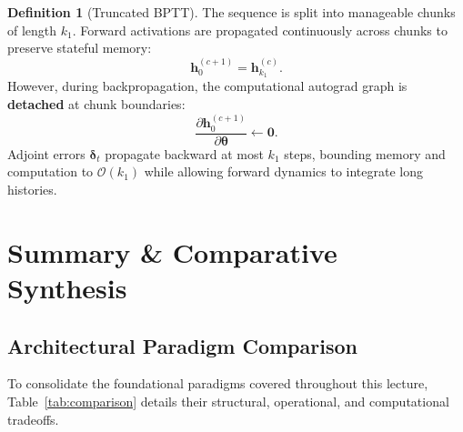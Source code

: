 \documentclass[11pt,a4paper]{article}
\theoremstyle{definition}
\newtheorem{definition}{Definition}[section]
\theoremstyle{plain}
\begin{document}
\begin{definition}[Truncated BPTT]
The sequence is split into manageable chunks of length $k_1$. Forward activations are propagated continuously across chunks to preserve stateful memory:
\begin{equation}
    \mathbf{h}_0^{(c+1)} = \mathbf{h}_{k_1}^{(c)}.
\end{equation}
However, during backpropagation, the computational autograd graph is \textbf{detached} at chunk boundaries:
\begin{equation}
    \frac{\partial \mathbf{h}_0^{(c+1)}}{\partial \boldsymbol{\theta}} \leftarrow \mathbf{0}.
\end{equation}
Adjoint errors $\boldsymbol{\delta}_t$ propagate backward at most $k_1$ steps, bounding memory and computation to $\mathcal{O}(k_1)$ while allowing forward dynamics to integrate long histories.
\end{definition}

\section{Summary \& Comparative Synthesis}

\subsection{Architectural Paradigm Comparison}
To consolidate the foundational paradigms covered throughout this lecture, Table~\ref{tab:comparison} details their structural, operational, and computational tradeoffs.
\end{document}
